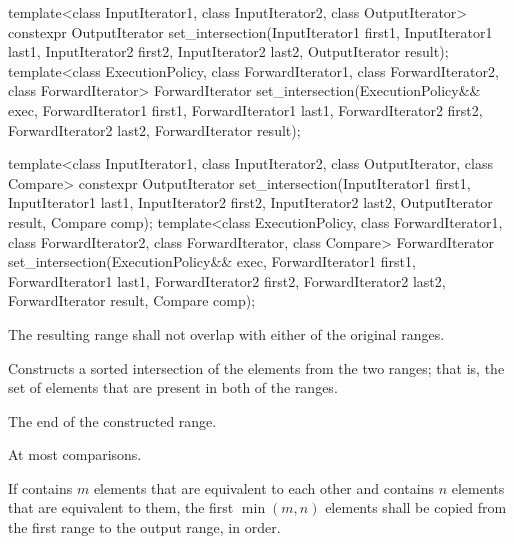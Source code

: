 %
\begin{itemdecl}
template<class InputIterator1, class InputIterator2,
         class OutputIterator>
  constexpr OutputIterator
    set_intersection(InputIterator1 first1, InputIterator1 last1,
                     InputIterator2 first2, InputIterator2 last2,
                     OutputIterator result);
template<class ExecutionPolicy, class ForwardIterator1, class ForwardIterator2,
         class ForwardIterator>
  ForwardIterator
    set_intersection(ExecutionPolicy&& exec,
                     ForwardIterator1 first1, ForwardIterator1 last1,
                     ForwardIterator2 first2, ForwardIterator2 last2,
                     ForwardIterator result);

template<class InputIterator1, class InputIterator2,
         class OutputIterator, class Compare>
  constexpr OutputIterator
    set_intersection(InputIterator1 first1, InputIterator1 last1,
                     InputIterator2 first2, InputIterator2 last2,
                     OutputIterator result, Compare comp);
template<class ExecutionPolicy, class ForwardIterator1, class ForwardIterator2,
         class ForwardIterator, class Compare>
  ForwardIterator
    set_intersection(ExecutionPolicy&& exec,
                     ForwardIterator1 first1, ForwardIterator1 last1,
                     ForwardIterator2 first2, ForwardIterator2 last2,
                     ForwardIterator result, Compare comp);
\end{itemdecl}

\begin{itemdescr}
\pnum
\requires
The resulting range shall not overlap with either of the original ranges.

\pnum
\effects
Constructs a sorted intersection of the elements from the two ranges;
that is, the set of elements that are present in both of the ranges.

\pnum
\returns
The end of the constructed range.

\pnum
\complexity
At most
comparisons.

\pnum
\remarks If  contains $m$ elements that are equivalent to
each other and  contains $n$ elements that are equivalent
to them, the first $\min(m, n)$ elements shall be copied from the first range
to the output range, in order.
\end{itemdescr}

